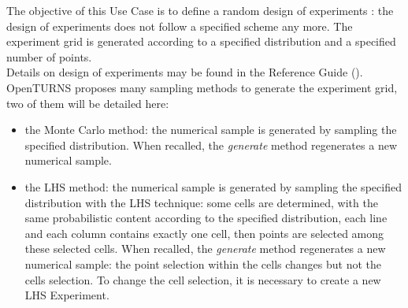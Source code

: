 \renewcommand{\filename}{docUC_MinMax_RandomExperimentPlane.tex}
\renewcommand{\filetitle}{UC: Creation of a random design of experiments : Monte Carlo, LHS patterns}

\HeaderIIILevel

\label{randomExpPlane}



The objective of this Use Case is to define a random design of experiments  : the design of experiments  does not follow a specified scheme any more. The experiment grid is generated according to a specified distribution and a specified number of points.\\


Details on design of experiments  may be found in the Reference Guide ().\\


OpenTURNS proposes many sampling methods to generate the experiment grid, two of them will be detailed here:
\begin{itemize}
\item the Monte Carlo method: the numerical sample is generated by sampling the specified distribution. When recalled, the {\itshape generate} method regenerates a new numerical sample.
\item the LHS method: the numerical sample is generated by sampling the specified distribution with the LHS technique:  some cells are determined, with the same probabilistic content according to the specified distribution, each line and each column contains exactly one cell, then points are selected among these selected cells. When recalled, the {\itshape generate} method regenerates a new numerical sample: the point selection within the cells changes but not the cells selection. To change the cell selection, it is necessary to create a new LHS Experiment.
\end{itemize}

